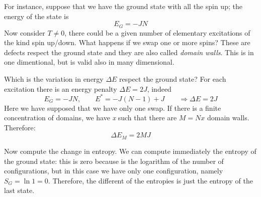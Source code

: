 \documentclass[../main/main.tex]{subfiles}
\begin{document}
For instance, suppose that we have the ground state with all the spin up; the energy of the state is
\begin{equation}
   E_G = -JN
\end{equation}
Now consider \( T \neq 0 \), there could be a given number of elementary excitations of the kind spin up/down. What happens if we swap one or more spins?
These are defects respect the ground state and they are also called \emph{domain walls}.
This is in one dimentional, but is valid also in many dimensional.

Which is the variation in energy \( \Delta E \) respect the ground state?
For each excitation there is an energy penalty \( \Delta E = 2J \), indeed
\begin{equation}
  E_G = -JN, \qquad E^* = -J(N-1) +J \qquad \Rightarrow \Delta E = 2J
\end{equation}
Here we have supposed that we have only one swap. If there is a finite concentration of domains, we have \emph{x} such that there are \(   M = Nx \) domain walls.
Therefore:
\begin{equation}
  \Delta E_M = 2MJ
\end{equation}

Now compute the change in entropy.
We can compute immediately the entropy of the ground state: this is zero because is the logarithm of the number of configurations, but in this case we have only one configuration, namely  \( S_G = \ln{1} =  0 \). Therefore, the different of the entropies is just the entropy of the last state.
\end{document}
